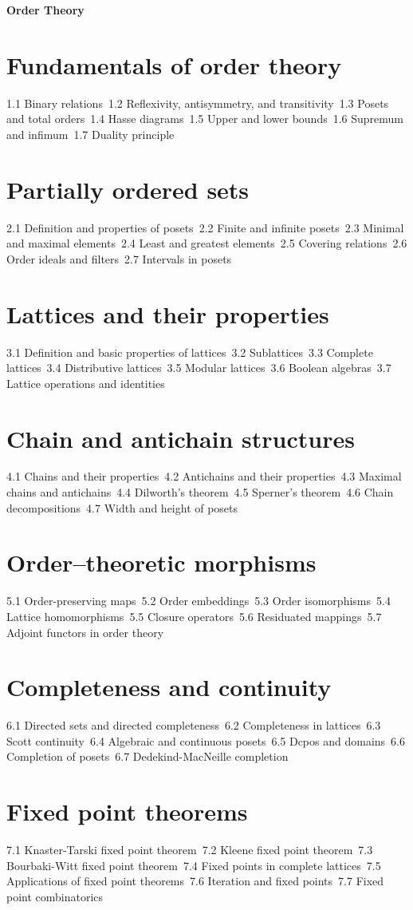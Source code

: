 {\LARGE \bf{Order Theory}}
\section{Fundamentals of order theory}
1.1 Binary relations\
1.2 Reflexivity, antisymmetry, and transitivity\
1.3 Posets and total orders\
1.4 Hasse diagrams\
1.5 Upper and lower bounds\
1.6 Supremum and infimum\
1.7 Duality principle\
\section{Partially ordered sets}
2.1 Definition and properties of posets\
2.2 Finite and infinite posets\
2.3 Minimal and maximal elements\
2.4 Least and greatest elements\
2.5 Covering relations\
2.6 Order ideals and filters\
2.7 Intervals in posets\
\section{Lattices and their properties}
3.1 Definition and basic properties of lattices\
3.2 Sublattices\
3.3 Complete lattices\
3.4 Distributive lattices\
3.5 Modular lattices\
3.6 Boolean algebras\
3.7 Lattice operations and identities\
\section{Chain and antichain structures}
4.1 Chains and their properties\
4.2 Antichains and their properties\
4.3 Maximal chains and antichains\
4.4 Dilworth's theorem\
4.5 Sperner's theorem\
4.6 Chain decompositions\
4.7 Width and height of posets\
\section{Order–theoretic morphisms}
5.1 Order-preserving maps\
5.2 Order embeddings\
5.3 Order isomorphisms\
5.4 Lattice homomorphisms\
5.5 Closure operators\
5.6 Residuated mappings\
5.7 Adjoint functors in order theory\
\section{Completeness and continuity}
6.1 Directed sets and directed completeness\
6.2 Completeness in lattices\
6.3 Scott continuity\
6.4 Algebraic and continuous posets\
6.5 Dcpos and domains\
6.6 Completion of posets\
6.7 Dedekind-MacNeille completion\
\section{Fixed point theorems}
7.1 Knaster-Tarski fixed point theorem\
7.2 Kleene fixed point theorem\
7.3 Bourbaki-Witt fixed point theorem\
7.4 Fixed points in complete lattices\
7.5 Applications of fixed point theorems\
7.6 Iteration and fixed points\
7.7 Fixed point combinatorics\
